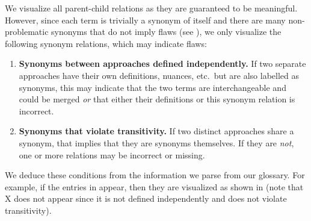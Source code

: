    
    \ExampleParChdGraphs{}

    \clearpage\fi
{}\label{relevantSyns}
We visualize all parent-child relations as they are guaranteed to be
meaningful.
However, since each term is trivially a synonym of itself and there are many
non-problematic synonyms that do not imply flaws (see ),
we only visualize the following synonym relations, which may indicate flaws:

\begin{enumerate}

    \item%
          \textbf{Synonyms between approaches defined independently.}\hfill\break
          If two separate approaches have their own definitions, nuances,
          etc.~but are also labelled as synonyms, this may indicate that the
          two terms are interchangeable and could be merged \emph{or} that
          either their definitions or this synonym relation is incorrect.

    \item%
          \textbf{Synonyms that violate transitivity.}\hfill\break
          If two distinct approaches share a synonym, that implies that they
          are synonyms themselves. If they are \emph{not}, one or more
          relations may be incorrect or missing.
\end{enumerate}
\ifnotpaper
    We deduce these conditions from the information we parse from our glossary.
    For example, if the entries in  appear, then
    they are visualized as shown in  (note that X
    does not appear since it is not defined independently and does not violate
    transitivity).

